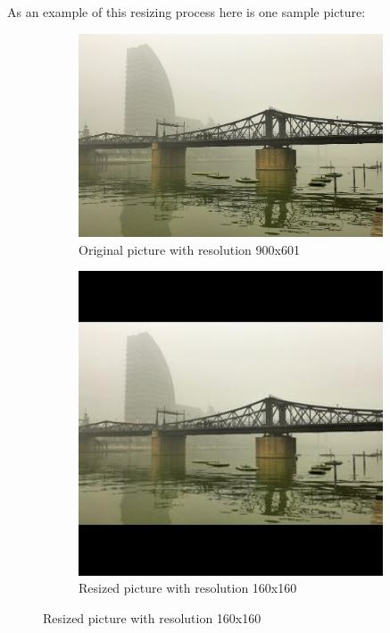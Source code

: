 \documentclass[a4paper]{article}
\begin{document}
As an example of this resizing process here is one sample picture:

\begin{figure} [h!]
\centering
\begin{subfigure}{0.5\textwidth}
  \centering
  \includegraphics[width=0.99\textwidth]{HAZE-1-1-1_001_ORI.jpg}
  \caption{Original picture with resolution 900x601}
  \label{fig:sub1}
\end{subfigure}%
\begin{subfigure}{0.5\textwidth}
  \centering
  \includegraphics[width=0.99\textwidth]{HAZE-1-1-1_001_ORI_resized.jpg}
  \caption{Resized picture with resolution 160x160}
  \label{fig:sub2}
\end{subfigure}
\label{fig:test}
\end{figure}
\end{document}
